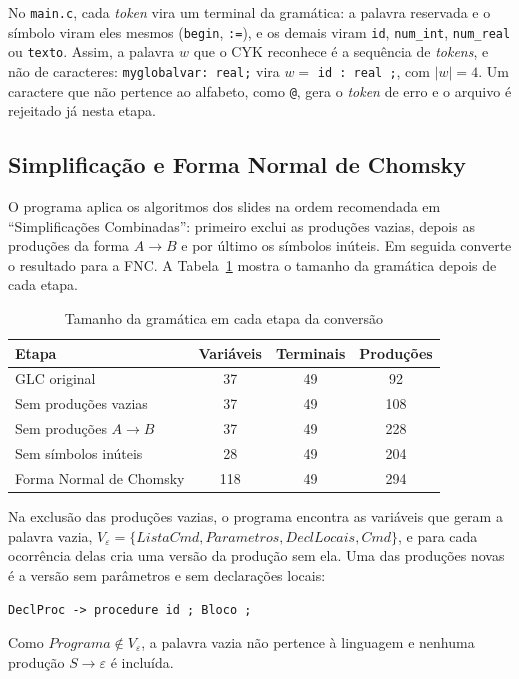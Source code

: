 \documentclass[12pt,a4paper]{article}
\newcommand{\fonte}[1][Elaborado pelos autores (2026).]{%
  \par\vspace{3pt}{\footnotesize Fonte: #1}\par}
\newcommand{\code}[1]{\texttt{#1}}
\begin{document}
No \code{main.c}, cada \textit{token} vira um terminal da gramática: a palavra reservada e o
símbolo viram eles mesmos (\code{begin}, \code{:=}), e os demais viram \code{id},
\code{num\_int}, \code{num\_real} ou \code{texto}. Assim, a palavra $w$ que o CYK reconhece é a
sequência de \textit{tokens}, e não de caracteres: \code{myglobalvar: real;} vira
$w = $ \code{id : real ;}, com $|w| = 4$. Um caractere que não pertence ao alfabeto, como
\code{@}, gera o \textit{token} de erro e o arquivo é rejeitado já nesta etapa.

\subsection{Simplificação e Forma Normal de Chomsky}

O programa aplica os algoritmos dos slides na ordem recomendada em ``Simplificações
Combinadas'': primeiro exclui as produções vazias, depois as produções da forma $A \to B$ e por
último os símbolos inúteis. Em seguida converte o resultado para a FNC. A Tabela~\ref{t:fnc}
mostra o tamanho da gramática depois de cada etapa.

\begin{table}[H]
\caption{Tamanho da gramática em cada etapa da conversão}\label{t:fnc}
\centering
\begin{tabular}{@{}lccc@{}}
\toprule
Etapa & Variáveis & Terminais & Produções \\
\midrule
GLC original              & 37  & 49 & 92 \\
Sem produções vazias      & 37  & 49 & 108 \\
Sem produções $A \to B$   & 37  & 49 & 228 \\
Sem símbolos inúteis      & 28  & 49 & 204 \\
Forma Normal de Chomsky   & 118 & 49 & 294 \\
\bottomrule
\end{tabular}
\fonte
\end{table}

Na exclusão das produções vazias, o programa encontra as variáveis que geram a palavra vazia,
$V_\varepsilon = \{\mathit{ListaCmd},\allowbreak \mathit{Parametros},\allowbreak
\mathit{DeclLocais},\allowbreak \mathit{Cmd}\}$, e para cada ocorrência delas cria uma versão da
produção sem ela. Uma das produções novas é a versão sem parâmetros e sem declarações locais:
\begin{center}\code{DeclProc -> procedure id ; Bloco ;}\end{center}
Como $\mathit{Programa} \notin V_\varepsilon$, a palavra vazia não pertence à linguagem e nenhuma
produção $S \to \varepsilon$ é incluída.
\end{document}
